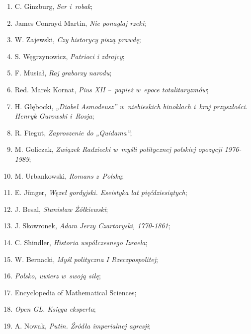 \documentclass[a4paper,11pt]{article}
\begin{document}
\begin{enumerate}
\item C. Ginzburg, \textit{Ser i~robak};

\item James Conrayd Martin, \textit{Nie ponaglaj rzeki};

\item W. Zajewski, \textit{Czy historycy piszą prawdę};

\item S. Węgrzynowicz, \textit{Patrioci i zdrajcy};

\item F. Musiał, \textit{Raj grabarzy narodu};

\item Red. Marek Kornat, \textit{Pius XII --~papież w~epoce
    totalitaryzmów};

\item H. Głębocki, \textit{„Diabeł Asmodeusz” w~niebieskich binoklach
    i~kraj przyszłości. Henryk Gurowski i~Rosja};

\item R. Fiegut, \textit{Zaproszenie do „Quidama”};

\item M. Goliczak, \textit{Związek Radziecki w~myśli politycznej
    polskiej opozycji 1976-1989};

\item M. Urbankowski, \textit{Romans z~Polską};

\item E. J\"{u}nger, \textit{Węzeł gordyjski. Eseistyka lat
    pięćdziesiątych};

\item J. Besal, \textit{Stanisław Żółkiewski};

\item J. Skowronek, \textit{Adam Jerzy Czartoryski, 1770-1861};

\item C. Shindler, \textit{Historia współczesnego Izraela};

\item W. Bernacki, \textit{Myśl polityczna I Rzeczpospolitej};

\item \textit{Polsko, uwierz w~swoją siłę};

\item Encyclopedia of Mathematical Sciences;

\item \textit{Open GL. Księga eksperta};

\item A. Nowak, \textit{Putin. Źródła imperialnej agresji};


\end{enumerate}
\end{document}
